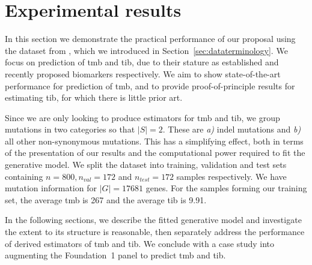 \documentclass[10pt,twoside,openright]{report}
\begin{document}
\section{Experimental results \label{sec:experimentalresults}}
In this section we demonstrate the practical performance of our proposal using the dataset from \citet{campbell_distinct_2016}, which we introduced in Section~\ref{sec:dataterminology}. We focus on prediction of \acrshort{tmb} and \acrshort{tib}, due to their stature as established and recently proposed biomarkers respectively. We aim to show state-of-the-art performance for prediction of \acrshort{tmb}, and to provide proof-of-principle results for estimating \acrshort{tib}, for which there is little prior art.

Since we are only looking to produce estimators for \acrshort{tmb} and \acrshort{tib}, we group mutations in two categories so that $|S|=2$. These are \textit{a)} indel mutations and \textit{b)} all other non-synonymous mutations. This has a simplifying effect, both in terms of the presentation of our results and the computational power required to fit the generative model. We split the dataset into training, validation and test sets containing $n=800, n_{val} = 172$ and $n_{test} = 172$ samples respectively. We have mutation information for $|G| = 17681$ genes. For the samples forming our training set, the average \acrshort{tmb} is 267 and the average \acrshort{tib} is 9.91. 

In the following sections, we describe the fitted generative model and investigate the extent to its structure is reasonable, then separately address the performance of derived estimators of \acrshort{tmb} and \acrshort{tib}. We conclude with a case study into augmenting the Foundation~1 panel to predict \acrshort{tmb} and \acrshort{tib}.
\end{document}
